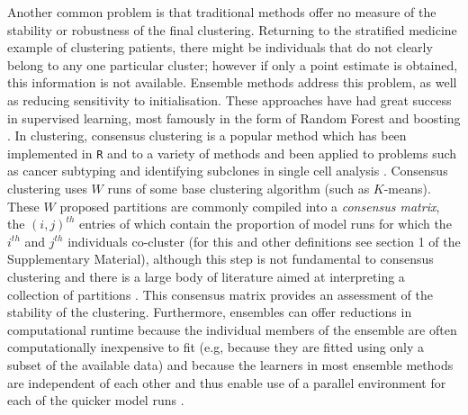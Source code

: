 \documentclass{bmcart}
\begin{document}
	Another common problem is that traditional methods offer  no  measure of the stability or robustness of the  final  clustering. Returning  to the  stratified  medicine example  of  clustering patients, there might be individuals that do not clearly belong to any one particular cluster; however if only a point estimate is obtained, this information is not available.
	Ensemble methods address this problem, as well as reducing sensitivity to initialisation. These approaches have had great success in supervised learning, most famously in the form of Random Forest \citep{breiman2001random} and boosting \citep{friedman2002stochastic}. In clustering, consensus clustering \citep{monti2003consensus} is a popular method which has been implemented in \texttt{R} \citep{wilkerson2010consensusclusterplus} and to a variety of methods \citep{john2020m3c, gu2020cola} and been applied to problems such as cancer subtyping \citep{lehmann2011identification, verhaak2010integrated} and identifying subclones in single cell analysis \citep{kiselev2017sc3}. Consensus clustering uses $W$ runs of some base clustering algorithm (such as $K$-means). These $W$ proposed partitions are commonly compiled into a \emph{consensus matrix}, the $(i, j)^{th}$ entries of which contain the proportion of model runs for which the $i^{th}$ and $j^{th}$ individuals co-cluster (for this and other definitions see section 1 of the Supplementary Material), although this step is not fundamental to consensus clustering and there is a large body of literature aimed at interpreting a collection of partitions \citep[see, e.g.,][]{LiWeightedConsensusClustering2008a,  CarpinetoConsensusClusteringBased2012,  StrehlClusterEnsemblesKnowledge}. This consensus matrix provides an assessment of the stability of the clustering. Furthermore, ensembles can offer reductions in computational runtime because the individual members of the ensemble are often computationally inexpensive to fit (e.g, because they are fitted using only a subset of the available data) and because the learners in most ensemble methods are independent of each other and thus enable use of a parallel environment for each of the quicker model runs \citep{ghaemi2009survey}. 
	
\end{document}
